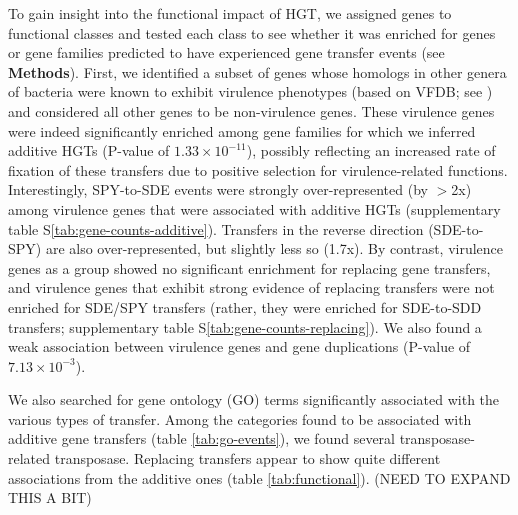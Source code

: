 \documentclass[12pt]{article}
\begin{document}
To gain insight into the functional impact of HGT, we assigned genes to
functional classes and tested each class to see whether it was enriched for
genes or gene families predicted to have experienced gene transfer events
(see \textbf{Methods}).  First, we identified a subset of genes whose homologs
in other
genera of bacteria were known to exhibit virulence phenotypes (based on
VFDB; see \citealp{Suzuki2011}) and considered all other genes to be
non-virulence genes.  These virulence genes were indeed significantly
enriched among gene families for which we inferred additive HGTs 
(P-value of $1.33 \times 10^{-11}$), 
possibly reflecting an increased rate of fixation of
these transfers due to positive selection for virulence-related functions.
Interestingly, SPY-to-SDE events were strongly over-represented (by
$>$2x) among virulence genes that were associated with additive HGTs 
(supplementary table S\ref{tab:gene-counts-additive}).  
Transfers in the reverse direction
(SDE-to-SPY) are also over-represented, but slightly less so
(1.7x).  By contrast, virulence genes as a group showed no significant
enrichment for replacing gene transfers, and virulence genes that exhibit
strong evidence of replacing transfers were not enriched for SDE/SPY %
transfers (rather, they were enriched for SDE-to-SDD transfers;
supplementary table S\ref{tab:gene-counts-replacing}).
We also found a weak association between virulence genes and gene
duplications (P-value of $7.13 \times 10^{-3}$). 


We also 
searched for gene ontology (GO) terms significantly associated with the
various types of 
transfer. Among the categories found to be associated with additive gene
transfers (table \ref{tab:go-events}), we found several transposase-related 
transposase.  
Replacing transfers appear to show quite different associations from the
additive ones (table \ref{tab:functional}). (NEED TO EXPAND THIS A BIT)
\end{document}
